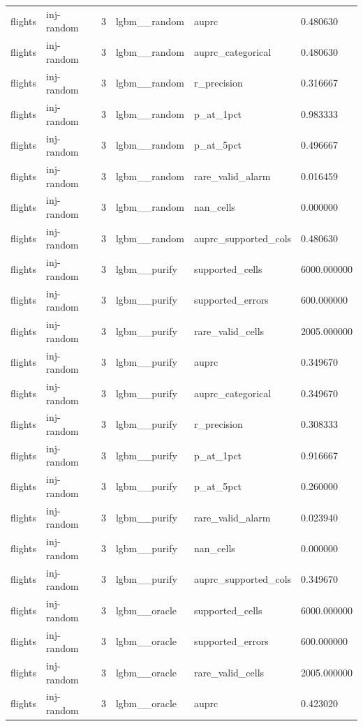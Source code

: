 \begin{tabular}{llllll}
flights & inj-random & 3 & lgbm\_\_random & auprc & 0.480630 \\
flights & inj-random & 3 & lgbm\_\_random & auprc\_categorical & 0.480630 \\
flights & inj-random & 3 & lgbm\_\_random & r\_precision & 0.316667 \\
flights & inj-random & 3 & lgbm\_\_random & p\_at\_1pct & 0.983333 \\
flights & inj-random & 3 & lgbm\_\_random & p\_at\_5pct & 0.496667 \\
flights & inj-random & 3 & lgbm\_\_random & rare\_valid\_alarm & 0.016459 \\
flights & inj-random & 3 & lgbm\_\_random & nan\_cells & 0.000000 \\
flights & inj-random & 3 & lgbm\_\_random & auprc\_supported\_cols & 0.480630 \\
flights & inj-random & 3 & lgbm\_\_purify & supported\_cells & 6000.000000 \\
flights & inj-random & 3 & lgbm\_\_purify & supported\_errors & 600.000000 \\
flights & inj-random & 3 & lgbm\_\_purify & rare\_valid\_cells & 2005.000000 \\
flights & inj-random & 3 & lgbm\_\_purify & auprc & 0.349670 \\
flights & inj-random & 3 & lgbm\_\_purify & auprc\_categorical & 0.349670 \\
flights & inj-random & 3 & lgbm\_\_purify & r\_precision & 0.308333 \\
flights & inj-random & 3 & lgbm\_\_purify & p\_at\_1pct & 0.916667 \\
flights & inj-random & 3 & lgbm\_\_purify & p\_at\_5pct & 0.260000 \\
flights & inj-random & 3 & lgbm\_\_purify & rare\_valid\_alarm & 0.023940 \\
flights & inj-random & 3 & lgbm\_\_purify & nan\_cells & 0.000000 \\
flights & inj-random & 3 & lgbm\_\_purify & auprc\_supported\_cols & 0.349670 \\
flights & inj-random & 3 & lgbm\_\_oracle & supported\_cells & 6000.000000 \\
flights & inj-random & 3 & lgbm\_\_oracle & supported\_errors & 600.000000 \\
flights & inj-random & 3 & lgbm\_\_oracle & rare\_valid\_cells & 2005.000000 \\
flights & inj-random & 3 & lgbm\_\_oracle & auprc & 0.423020 \\

\end{tabular}
